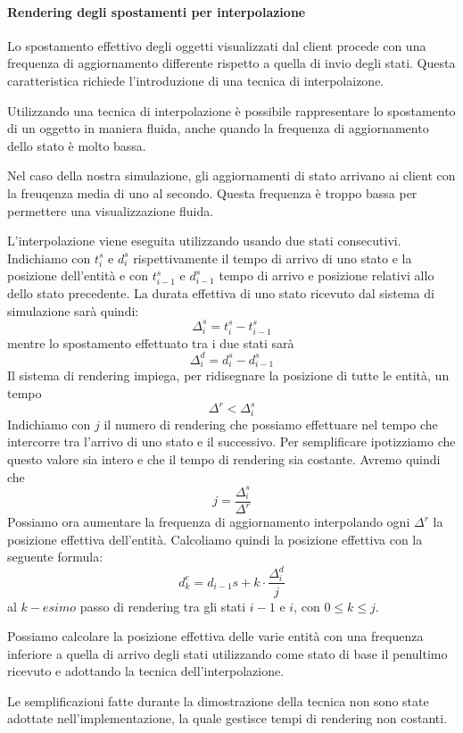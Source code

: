 \paragraph*{Rendering degli spostamenti per interpolazione}
Lo spostamento effettivo degli oggetti visualizzati dal client procede con una
frequenza di aggiornamento differente rispetto a quella di invio degli stati.
Questa caratteristica richiede l'introduzione di una tecnica di interpolaizone.

Utilizzando una tecnica di interpolazione è possibile rappresentare lo
spostamento di un oggetto in maniera fluida, anche quando la frequenza di
aggiornamento dello stato è molto bassa.

Nel caso della nostra simulazione, gli aggiornamenti di stato arrivano ai client
con la freuqenza media di uno al secondo. Questa frequenza è troppo bassa per
permettere una visualizzazione fluida. 

L'interpolazione viene eseguita utilizzando usando due stati consecutivi.
Indichiamo con $t_{i}^{s}$ e $d_{i}^{s}$ rispettivamente il tempo di arrivo di
uno stato e la posizione dell'entità e con $t_{i-1}^{s}$ e $d_{i-1}^{s}$ tempo
di arrivo e posizione relativi allo dello stato precedente. La durata effettiva
di uno stato ricevuto dal sistema di simulazione sarà quindi:
$$\Delta_{i}^{s}=t_{i}^{s}-t_{i-1}^{s}$$ mentre lo spostamento effettuato tra i
due stati sarà $$\Delta_{i}^{d}=d_{i}^{s}-d_{i-1}^{s}$$
Il sistema di rendering impiega, per ridisegnare la posizione di
tutte le entità, un tempo $$\Delta^{r}<\Delta_{i}^{s}$$
Indichiamo con $j$ il numero di rendering che possiamo effettuare nel tempo che
intercorre tra l'arrivo di uno stato e il successivo. Per semplificare
ipotizziamo che questo valore sia intero e che il tempo di rendering sia
costante.
Avremo quindi che $$j=\frac{\Delta_{i}^{s}}{\Delta^{r}}$$
Possiamo ora aumentare la frequenza di aggiornamento interpolando ogni
$\Delta^{r}$ la posizione effettiva dell'entità.
Calcoliamo quindi la posizione effettiva con la seguente formula:
$$d_{k}^{e}=d_{i-1}{s}+k\cdot\frac{\Delta_{i}^{d}}{j}$$ al $k-esimo$ passo di
rendering tra gli stati $i-1$ e $i$, con $0 \leq k \leq j$.

Possiamo calcolare la posizione effettiva delle varie entità con una frequenza
inferiore a quella di arrivo degli stati utilizzando come stato di base il
penultimo ricevuto e adottando la tecnica dell'interpolazione.

Le semplificazioni fatte durante la dimostrazione della tecnica non sono state
adottate nell'implementazione, la quale gestisce tempi di rendering non
costanti.

